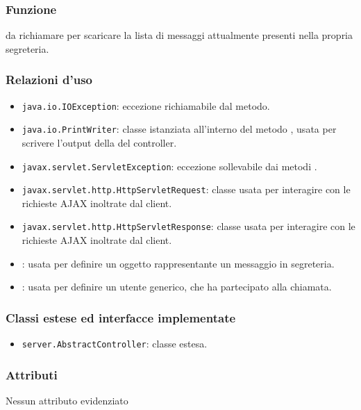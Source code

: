 
\subsubsection*{Funzione}
 da richiamare per scaricare la lista di messaggi attualmente presenti nella propria segreteria.

\subsubsection*{Relazioni d'uso}
\begin{itemize}
	\item \texttt{java.io.IOException}: eccezione richiamabile dal metodo.
	\item \texttt{java.io.PrintWriter}: classe istanziata all'interno del metodo , usata per scrivere l'output della del controller.
	\item \texttt{javax.servlet.ServletException}: eccezione sollevabile dai metodi .
	\item \texttt{javax.servlet.http.HttpServletRequest}: classe usata per interagire con le richieste AJAX inoltrate dal client.
	\item \texttt{javax.servlet.http.HttpServletResponse}: classe usata per interagire con le richieste AJAX inoltrate dal client.
	\item {}: usata per definire un oggetto rappresentante un messaggio in segreteria.
	\item {}: usata per definire un utente generico, che ha partecipato alla chiamata.
\end{itemize}

\subsubsection*{Classi estese ed interfacce implementate}
\begin{itemize}
	\item \texttt{server.AbstractController}: classe estesa.
\end{itemize}

\subsubsection*{Attributi}

Nessun attributo evidenziato

